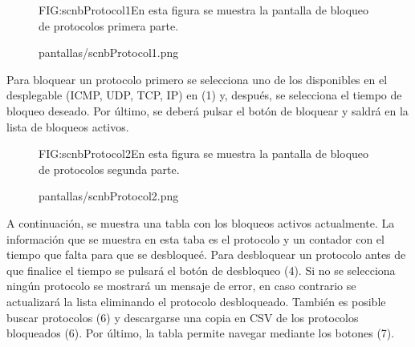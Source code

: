 \begin{figure}[Pantalla de bloqueo de protocolos parte 1]{FIG:scnbProtocol1}{En esta figura se muestra la pantalla de bloqueo de protocolos primera parte.}
  \begin{image}{}{}{pantallas/scnbProtocol1.png}
  \end{image}
\end{figure}

Para bloquear un protocolo primero se selecciona uno de los disponibles en el desplegable (ICMP, UDP, TCP, IP) en (1) y, después, se selecciona el tiempo de bloqueo deseado. Por último, se deberá pulsar el botón de bloquear y saldrá en la lista de bloqueos activos.

\begin{figure}[Pantalla de bloqueo de protocolos parte 2]{FIG:scnbProtocol2}{En esta figura se muestra la pantalla de bloqueo de protocolos segunda parte.}
  \begin{image}{}{}{pantallas/scnbProtocol2.png}
  \end{image}
\end{figure}

A continuación, se muestra una tabla con los bloqueos activos actualmente. La información que se muestra en esta taba es el protocolo y un contador con el tiempo que falta para que se desbloqueé. Para desbloquear un protocolo antes de que finalice el tiempo se pulsará el botón de desbloqueo (4). Si no se selecciona ningún protocolo se mostrará un mensaje de error, en caso contrario se actualizará la lista eliminando el protocolo desbloqueado. También es posible buscar protocolos (6) y descargarse una copia en CSV de los protocolos bloqueados (6). Por último, la tabla permite navegar mediante los botones (7). 